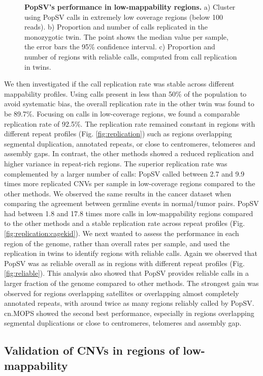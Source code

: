 \begin{figure}[htp]
  \caption[{\sf PopSV}'s performance in low-mappability regions.]{{\bf {\sf PopSV}'s performance in low-mappability regions.} {\small a) Cluster using {\sf PopSV} calls in extremely low coverage regions (below 100 reads). b) Proportion and number of calls replicated in the monozygotic twin. The point shows the median value per sample, the error bars the 95\% confidence interval. c) Proportion and number of regions with reliable calls, computed from call replication in twins.}}
\end{figure}
We then investigated if the call replication rate was stable across different mappability profiles.
Using calls present in less than 50\% of the population to avoid systematic bias, the overall replication rate in the other twin was found to be 89.7\%.
Focusing on calls in low-coverage regions, we found a comparable replication rate of 92.5\%.
The replication rate remained constant in regions with different repeat profiles (Fig. \ref{fig:replication}) such as regions overlapping segmental duplication, annotated repeats, or close to centromeres, telomeres and assembly gaps.
In contrast, the other methods showed a reduced replication and higher variance in repeat-rich regions.
The superior replication rate was complemented by a larger number of calls: {\sf PopSV} called between 2.7 and 9.9 times more replicated CNVs per sample in low-coverage regions compared to the other methods.
We observed the same results in the cancer dataset when comparing the agreement between germline events in normal/tumor pairs.
{\sf PopSV} had between 1.8 and 17.8 times more calls in low-mappability regions compared to the other methods and a stable replication rate across repeat profiles (Fig. \ref{fig:replication:cagekid}).
We next wanted to assess the performance in each region of the genome, rather than overall rates per sample, and used the replication in twins to identify regions with reliable calls.
Again we observed that {\sf PopSV} was as reliable overall as in regions with different repeat profiles (Fig. \ref{fig:reliable}).
This analysis also showed that {\sf PopSV} provides reliable calls in a larger fraction of the genome compared to other methods.
The strongest gain was observed for regions overlapping satellites or overlapping almost completely annotated repeats, with around twice as many regions reliably called by {\sf PopSV}.
{\sf cn.MOPS} showed the second best performance, especially in regions overlapping segmental duplications or close to centromeres, telomeres and assembly gap.

\subsection*{Validation of CNVs in regions of low-mappability}

